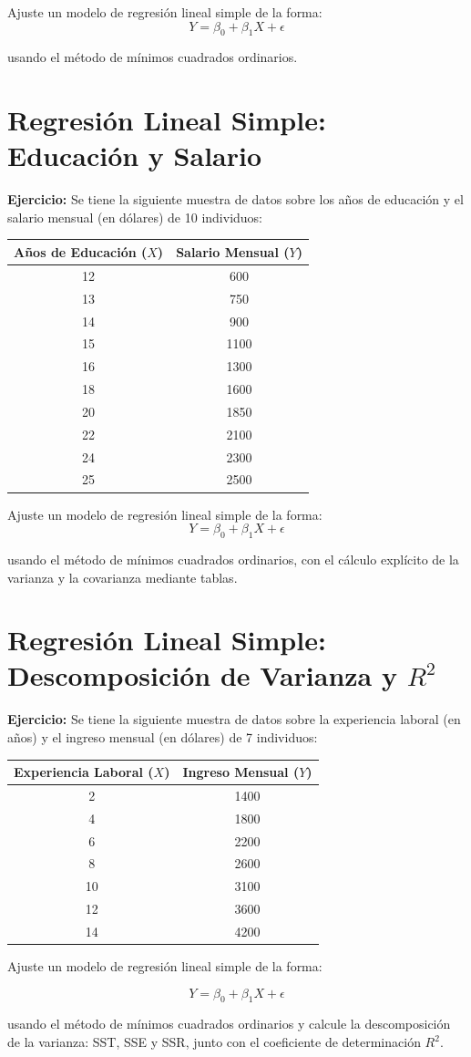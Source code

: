 \documentclass[10pt,a4paper]{article}
\begin{document}
Ajuste un modelo de regresión lineal simple de la forma:
$$Y = \beta_0 + \beta_1 X + \epsilon $$

usando el método de mínimos cuadrados ordinarios.



\section{Regresión Lineal Simple: Educación y Salario}

\textbf{Ejercicio:} Se tiene la siguiente muestra de datos sobre los años de educación y el salario mensual (en dólares) de 10 individuos:

\begin{center}
\begin{tabular}{|c|c|}
\hline
Años de Educación ($X$) & Salario Mensual ($Y$) \\
\hline
12  & 600  \\
\hline
13  & 750  \\
\hline
14  & 900  \\
\hline
15  & 1100 \\
\hline
16  & 1300 \\
\hline
18  & 1600 \\
\hline
20  & 1850 \\
\hline
22  & 2100 \\
\hline
24  & 2300 \\
\hline
25  & 2500 \\
\hline
\end{tabular}
\end{center}

Ajuste un modelo de regresión lineal simple de la forma:
$$Y = \beta_0 + \beta_1 X + \epsilon $$


usando el método de mínimos cuadrados ordinarios, con el cálculo explícito de la varianza y la covarianza mediante tablas.


\section{Regresión Lineal Simple: Descomposición de Varianza y $R^2$}

\textbf{Ejercicio:} Se tiene la siguiente muestra de datos sobre la experiencia laboral (en años) y el ingreso mensual (en dólares) de 7 individuos:

\begin{center}
\begin{tabular}{|c|c|}
\hline
Experiencia Laboral ($X$) & Ingreso Mensual ($Y$) \\
\hline
2   & 1400  \\
\hline
4   & 1800  \\
\hline
6   & 2200  \\
\hline
8   & 2600  \\
\hline
10  & 3100  \\
\hline
12  & 3600  \\
\hline
14  & 4200  \\
\hline
\end{tabular}
\end{center}

Ajuste un modelo de regresión lineal simple de la forma:

$$Y = \beta_0 + \beta_1 X + \epsilon $$

usando el método de mínimos cuadrados ordinarios y calcule la descomposición de la varianza: SST, SSE y SSR, junto con el coeficiente de determinación $R^2$.
\end{document}

